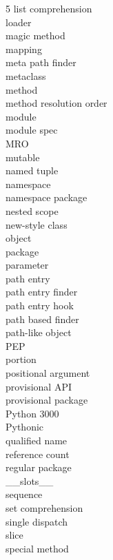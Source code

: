 \documentclass [8pt] {extarticle}
\begin{document}
\begin {multicols} {5}
        list comprehension \\
        loader \\
        magic method \\
        mapping \\
        meta path finder \\
        metaclass \\
        method \\
        method resolution order \\
        module \\
        module spec \\
        MRO \\
        mutable \\
        named tuple \\
        namespace \\
        namespace package \\
        nested scope \\
        new-style class \\
        object \\
        package \\
        parameter \\
        path entry \\
        path entry finder \\
        path entry hook \\
        path based finder \\
        path-like object \\
        PEP \\
        portion \\
        positional argument \\
        provisional API \\
        provisional package \\
        Python 3000 \\
        Pythonic \\
        qualified name \\
        reference count \\
        regular package \\
        \_\_slots\_\_ \\
        sequence \\
        set comprehension \\
        single dispatch \\
        slice \\
        special method \\

\end{multicols}
\end{document}
